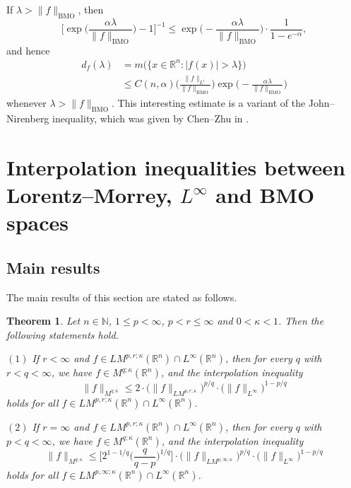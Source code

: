 \documentclass{birkjour}
\newtheorem{thm}{Theorem}[section]
\theoremstyle{definition}
\theoremstyle{remark}
\numberwithin{equation}{section}
\begin{document}
If $\lambda>\|f\|_{\mathrm{BMO}}$, then
\begin{equation*}
\Big[\exp\Big(\frac{\alpha\lambda}{\|f\|_{\mathrm{BMO}}}\Big)-1\Big]^{-1}
\leq\exp\Big(-\frac{\alpha\lambda}{\|f\|_{\mathrm{BMO}}}\Big)
\cdot\frac{1}{1-e^{-\alpha}},
\end{equation*}
and hence
\begin{equation*}
\begin{split}
d_f(\lambda)&=m\big(\big\{x\in \mathbb R^n:|f(x)|>\lambda\big\}\big)\\
&\leq C({n,\alpha})\bigg(\frac{\|f\|_{L^1}}{\|f\|_{\mathrm{BMO}}}\bigg)\exp\Big(-\frac{\alpha\lambda}{\|f\|_{\mathrm{BMO}}}\Big)
\end{split}
\end{equation*}
whenever $\lambda>\|f\|_{\mathrm{BMO}}$. This interesting estimate is a variant of the John--Nirenberg inequality, which was given by Chen--Zhu in \cite[(4)]{Chen}.

\section{Interpolation inequalities between Lorentz--Morrey, $L^{\infty}$ and BMO spaces}
\subsection{Main results}
The main results of this section are stated as follows.

\begin{thm}\label{thmwang2}
Let $n\in \mathbb{N}$, $1\leq p<\infty$, $p<r\leq\infty$ and $0<\kappa<1$. Then the following statements hold.

$(1)$ If $r<\infty$ and $f\in LM^{p,r;\kappa}(\mathbb R^n)\cap{L^\infty}(\mathbb R^n)$, then for every $q$ with $r<q<\infty$, we have $f\in M^{q;\kappa}(\mathbb R^n)$, and the interpolation inequality
\begin{equation*}
\|f\|_{M^{q;\kappa}}\leq 2\cdot\big(\|f\|_{LM^{p,r;\kappa}}\big)^{p/q}\cdot\big(\|f\|_{L^\infty}\big)^{1-p/q}
\end{equation*}
holds for all $f\in LM^{p,r;\kappa}(\mathbb R^n)\cap{L^\infty}(\mathbb R^n)$.

$(2)$ If $r=\infty$ and $f\in LM^{p,r;\kappa}(\mathbb R^n)\cap{L^\infty}(\mathbb R^n)$, then for every $q$ with $p<q<\infty$, we have $f\in M^{q;\kappa}(\mathbb R^n)$, and the interpolation inequality
\begin{equation*}
\|f\|_{M^{q;\kappa}}\leq \Big[2^{1-1/q}\Big(\frac{q}{q-p}\Big)^{1/q}\Big]
\cdot\big(\|f\|_{LM^{p,\infty;\kappa}}\big)^{p/q}\cdot\big(\|f\|_{L^\infty}\big)^{1-p/q}
\end{equation*}
holds for all $f\in LM^{p,\infty;\kappa}(\mathbb R^n)\cap{L^\infty}(\mathbb R^n)$.
\end{thm}
\end{document}
